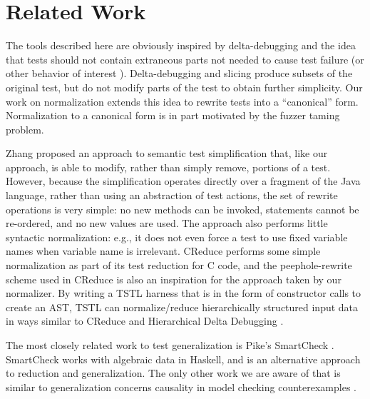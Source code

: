 \section{Related Work}

The tools described here are obviously inspired by  delta-debugging
\cite{DD} and the idea that tests should not contain extraneous parts not needed to
cause test failure (or other behavior of interest \cite{icst2014,stvrcausereduce}).  Delta-debugging and slicing
\cite{TCminim} produce subsets of the
original test, but do not modify parts of the test to obtain further
simplicity.  Our work on normalization \cite{OneTest} extends this
idea to rewrite tests into a ``canonical'' form.  Normalization to a
canonical form is in part motivated by the fuzzer taming \cite{PLDI13}
problem.

Zhang \cite{SaiSimple} proposed an approach to semantic
test simplification that, like our approach, is able to modify, rather
than simply remove, portions of a test.  However, because the simplification
operates directly over a fragment of the Java language, rather than
using an abstraction of test actions, the set of rewrite
operations is very simple: no new methods can be
invoked, statements cannot be re-ordered, and no new values are used.
The approach also performs little syntactic normalization: e.g., it does not even force a test to use
fixed variable names when variable name is irrelevant.  CReduce
\cite{CReduce} performs some simple normalization as part of its
test reduction for C code, and the peephole-rewrite scheme
used in CReduce is also an inspiration for the approach taken by our
normalizer.  By writing a TSTL harness that is in the form of
constructor calls to create an AST, TSTL can normalize/reduce hierarchically
structured input data in ways similar to CReduce and Hierarchical
Delta Debugging \cite{HDD}.

The most closely related work to test generalization is Pike's
SmartCheck \cite{SmartCheck}.  SmartCheck works with algebraic data in
Haskell, and is an alternative approach to reduction
and generalization.  The only other work we are aware of that is
similar to generalization concerns causality in
model checking counterexamples \cite{FreeWill,MakeMost,SPIN03}.  